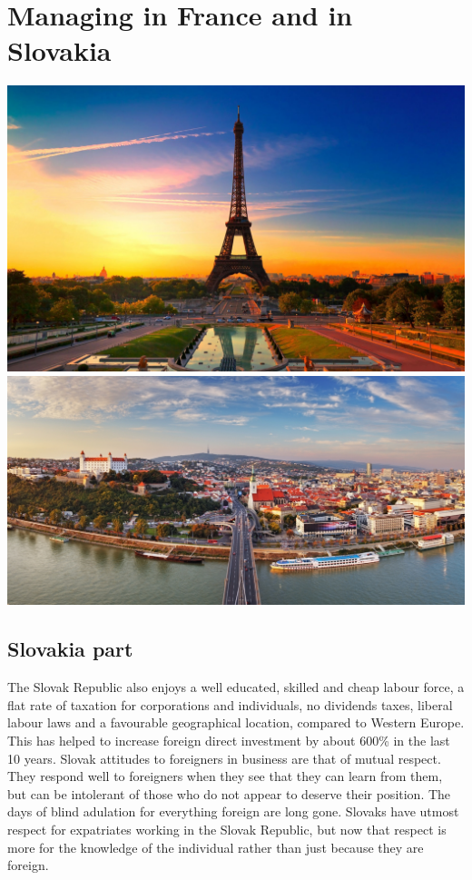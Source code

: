 \documentclass[a4paper,12pt]{report} %
\begin{document}
\section{Managing in France and in Slovakia}
\includegraphics[scale=0.30]{france.jpg}
\includegraphics[scale=0.45]{slovakia.jpg}
\newpage
\subsection{Slovakia part}
The Slovak Republic also enjoys a well educated, skilled and cheap labour force, a flat rate of taxation for corporations and individuals, no dividends taxes, liberal labour laws and a favourable geographical location, compared to Western Europe. This has helped to increase foreign direct investment by about 600\% in the last 10 years.
Slovak attitudes to foreigners in business are that of mutual respect. They respond well to foreigners when they see that they can learn from them, but can be intolerant of those who do not appear to deserve their position. The days of blind adulation for everything foreign are long gone. Slovaks have utmost respect for expatriates working in the Slovak Republic, but now that respect is more for the knowledge of the individual rather than just because they are foreign.
\end{document}
